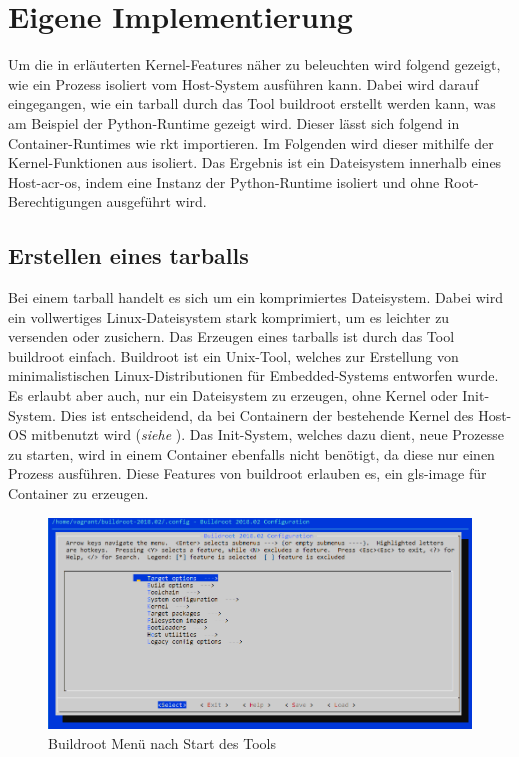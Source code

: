 \section{Eigene Implementierung}
\label{sec:eigeneImpl}
Um die in  erläuterten Kernel-Features näher zu beleuchten wird folgend gezeigt, wie ein Prozess isoliert vom Host-System ausführen kann. Dabei wird darauf eingegangen, wie ein tarball durch das Tool buildroot erstellt werden kann, was am Beispiel der Python-Runtime gezeigt wird. Dieser lässt sich folgend in Container-Runtimes wie rkt importieren. Im Folgenden wird dieser mithilfe der Kernel-Funktionen aus  isoliert. Das Ergebnis ist ein Dateisystem innerhalb eines Host-\gls{acr-os}, indem  eine Instanz der Python-Runtime isoliert und ohne Root-Berechtigungen ausgeführt wird.

\subsection{Erstellen eines tarballs}
\label{sec:tarball}
Bei einem tarball handelt es sich um ein komprimiertes Dateisystem. Dabei wird ein vollwertiges Linux-Dateisystem stark komprimiert, um es leichter zu versenden oder zusichern. Das Erzeugen eines tarballs ist durch das Tool buildroot einfach. Buildroot ist ein Unix-Tool, welches zur Erstellung von minimalistischen Linux-Distributionen für Embedded-Systems entworfen wurde. Es erlaubt aber auch, nur ein Dateisystem zu erzeugen, ohne Kernel oder Init-System. Dies ist entscheidend, da bei Containern der bestehende Kernel des Host-OS mitbenutzt wird (\textit{siehe }). Das Init-System, welches dazu dient, neue Prozesse zu starten, wird in einem Container ebenfalls nicht benötigt, da diese nur einen Prozess ausführen. Diese Features von buildroot erlauben es, ein \gls{gls-image} für Container zu erzeugen.

\begin{figure}[h]
	\begin{center}
		\includegraphics[scale=0.5]{bilder/buildroot-menuconfig.png}
		\caption{Buildroot Menü nach Start des Tools}
		\label{fig:buildrootMenuConfig}
	\end{center}
\end{figure}

